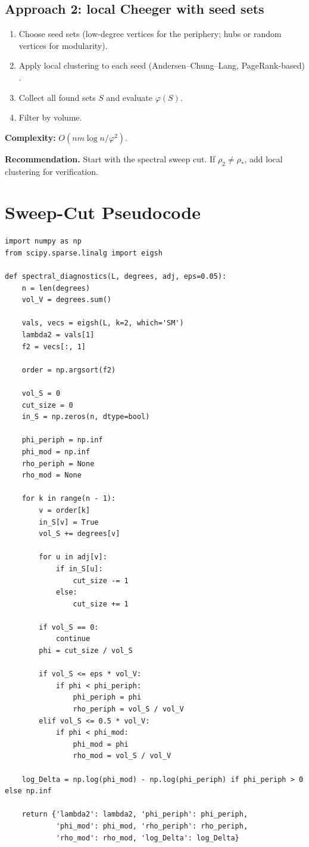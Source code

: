 \documentclass[11pt,a4paper]{article}
\theoremstyle{plain}
\theoremstyle{definition}
\theoremstyle{remark}
\newcommand{\Ph}{\varphi}
\begin{document}
\subsection*{Approach 2: local Cheeger with seed sets}

\begin{enumerate}[leftmargin=*]
\item Choose seed sets (low-degree vertices for the periphery; hubs or random
vertices for modularity).
\item Apply local clustering to each seed (Andersen--Chung--Lang,
PageRank-based) \cite{AndersenChungLang2006}.
\item Collect all found sets $S$ and evaluate $\Ph(S)$.
\item Filter by volume.
\end{enumerate}
\textbf{Complexity:} $O(nm\log n/\Ph^2)$.

\textbf{Recommendation.} Start with the spectral sweep cut. If
$\rho_2\ne\rho_*$, add local clustering for verification.

\section{Sweep-Cut Pseudocode}
\label{sec:pseudocode}

\begin{lstlisting}
import numpy as np
from scipy.sparse.linalg import eigsh

def spectral_diagnostics(L, degrees, adj, eps=0.05):
    n = len(degrees)
    vol_V = degrees.sum()

    vals, vecs = eigsh(L, k=2, which='SM')
    lambda2 = vals[1]
    f2 = vecs[:, 1]

    order = np.argsort(f2)

    vol_S = 0
    cut_size = 0
    in_S = np.zeros(n, dtype=bool)

    phi_periph = np.inf
    phi_mod = np.inf
    rho_periph = None
    rho_mod = None

    for k in range(n - 1):
        v = order[k]
        in_S[v] = True
        vol_S += degrees[v]

        for u in adj[v]:
            if in_S[u]:
                cut_size -= 1
            else:
                cut_size += 1

        if vol_S == 0:
            continue
        phi = cut_size / vol_S

        if vol_S <= eps * vol_V:
            if phi < phi_periph:
                phi_periph = phi
                rho_periph = vol_S / vol_V
        elif vol_S <= 0.5 * vol_V:
            if phi < phi_mod:
                phi_mod = phi
                rho_mod = vol_S / vol_V

    log_Delta = np.log(phi_mod) - np.log(phi_periph) if phi_periph > 0 else np.inf

    return {'lambda2': lambda2, 'phi_periph': phi_periph,
            'phi_mod': phi_mod, 'rho_periph': rho_periph,
            'rho_mod': rho_mod, 'log_Delta': log_Delta}
\end{lstlisting}
\end{document}
